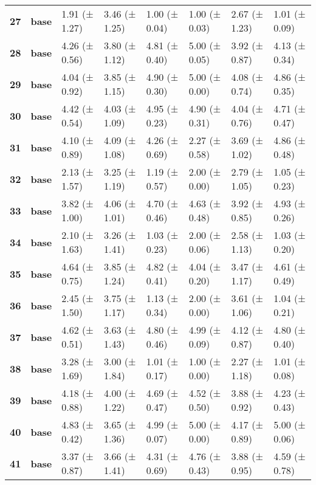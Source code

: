 \begin{longtable}{llllllll}
\cline{1-8}
\textbf{27} & \textbf{base} & 1.91 (± 1.27) & 3.46 (± 1.25) & 1.00 (± 0.04) & 1.00 (± 0.03) & 2.67 (± 1.23) & 1.01 (± 0.09) \\
\cline{1-8}
\textbf{28} & \textbf{base} & 4.26 (± 0.56) & 3.80 (± 1.12) & 4.81 (± 0.40) & 5.00 (± 0.05) & 3.92 (± 0.87) & 4.13 (± 0.34) \\
\cline{1-8}
\textbf{29} & \textbf{base} & 4.04 (± 0.92) & 3.85 (± 1.15) & 4.90 (± 0.30) & 5.00 (± 0.00) & 4.08 (± 0.74) & 4.86 (± 0.35) \\
\cline{1-8}
\textbf{30} & \textbf{base} & 4.42 (± 0.54) & 4.03 (± 1.09) & 4.95 (± 0.23) & 4.90 (± 0.31) & 4.04 (± 0.76) & 4.71 (± 0.47) \\
\cline{1-8}
\textbf{31} & \textbf{base} & 4.10 (± 0.89) & 4.09 (± 1.08) & 4.26 (± 0.69) & 2.27 (± 0.58) & 3.69 (± 1.02) & 4.86 (± 0.48) \\
\cline{1-8}
\textbf{32} & \textbf{base} & 2.13 (± 1.57) & 3.25 (± 1.19) & 1.19 (± 0.57) & 2.00 (± 0.00) & 2.79 (± 1.05) & 1.05 (± 0.23) \\
\cline{1-8}
\textbf{33} & \textbf{base} & 3.82 (± 1.00) & 4.06 (± 1.01) & 4.70 (± 0.46) & 4.63 (± 0.48) & 3.92 (± 0.85) & 4.93 (± 0.26) \\
\cline{1-8}
\textbf{34} & \textbf{base} & 2.10 (± 1.63) & 3.26 (± 1.41) & 1.03 (± 0.23) & 2.00 (± 0.06) & 2.58 (± 1.13) & 1.03 (± 0.20) \\
\cline{1-8}
\textbf{35} & \textbf{base} & 4.64 (± 0.75) & 3.85 (± 1.24) & 4.82 (± 0.41) & 4.04 (± 0.20) & 3.47 (± 1.17) & 4.61 (± 0.49) \\
\cline{1-8}
\textbf{36} & \textbf{base} & 2.45 (± 1.50) & 3.75 (± 1.17) & 1.13 (± 0.34) & 2.00 (± 0.00) & 3.61 (± 1.06) & 1.04 (± 0.21) \\
\cline{1-8}
\textbf{37} & \textbf{base} & 4.62 (± 0.51) & 3.63 (± 1.43) & 4.80 (± 0.46) & 4.99 (± 0.09) & 4.12 (± 0.87) & 4.80 (± 0.40) \\
\cline{1-8}
\textbf{38} & \textbf{base} & 3.28 (± 1.69) & 3.00 (± 1.84) & 1.01 (± 0.17) & 1.00 (± 0.00) & 2.27 (± 1.18) & 1.01 (± 0.08) \\
\cline{1-8}
\textbf{39} & \textbf{base} & 4.18 (± 0.88) & 4.00 (± 1.22) & 4.69 (± 0.47) & 4.52 (± 0.50) & 3.88 (± 0.92) & 4.23 (± 0.43) \\
\cline{1-8}
\textbf{40} & \textbf{base} & 4.83 (± 0.42) & 3.65 (± 1.36) & 4.99 (± 0.07) & 5.00 (± 0.00) & 4.17 (± 0.89) & 5.00 (± 0.06) \\
\cline{1-8}
\textbf{41} & \textbf{base} & 3.37 (± 0.87) & 3.66 (± 1.41) & 4.31 (± 0.69) & 4.76 (± 0.43) & 3.88 (± 0.95) & 4.59 (± 0.78) \\

\end{longtable}
